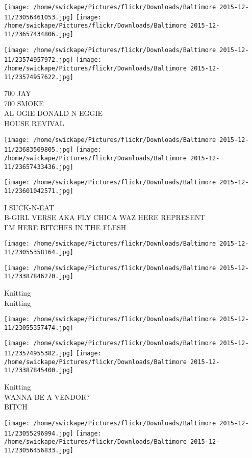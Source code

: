 \documentclass[10pt,letterpaper]{article}
\begin{document}
\texttt{[image: /home/swickape/Pictures/flickr/Downloads/Baltimore 2015-12-11/23056461053.jpg]}
\texttt{[image: /home/swickape/Pictures/flickr/Downloads/Baltimore 2015-12-11/23657434806.jpg]}

\texttt{[image: /home/swickape/Pictures/flickr/Downloads/Baltimore 2015-12-11/23574957972.jpg]}
\texttt{[image: /home/swickape/Pictures/flickr/Downloads/Baltimore 2015-12-11/23574957622.jpg]}

700 JAY\\
700 SMOKE\\
AL OGIE DONALD N EGGIE\\
HOUSE REVIVAL
\pagebreak

\texttt{[image: /home/swickape/Pictures/flickr/Downloads/Baltimore 2015-12-11/23683509805.jpg]}
\texttt{[image: /home/swickape/Pictures/flickr/Downloads/Baltimore 2015-12-11/23657433436.jpg]}

\texttt{[image: /home/swickape/Pictures/flickr/Downloads/Baltimore 2015-12-11/23601042571.jpg]}

I SUCK{-}N{-}EAT\\
B{-}GIRL VERSE AKA FLY CHICA WAZ HERE REPRESENT\\
I'M HERE BITCHES IN THE FLESH
\pagebreak

\texttt{[image: /home/swickape/Pictures/flickr/Downloads/Baltimore 2015-12-11/23055358164.jpg]}

\vspace{0.25in}
\texttt{[image: /home/swickape/Pictures/flickr/Downloads/Baltimore 2015-12-11/23387846270.jpg]}

Knitting\\
Knitting
\pagebreak

\texttt{[image: /home/swickape/Pictures/flickr/Downloads/Baltimore 2015-12-11/23055357474.jpg]}

\vspace{0.25in}
\texttt{[image: /home/swickape/Pictures/flickr/Downloads/Baltimore 2015-12-11/23574955382.jpg]}
\texttt{[image: /home/swickape/Pictures/flickr/Downloads/Baltimore 2015-12-11/23387845400.jpg]}

Knitting\\
WANNA BE A VENDOR?\\
BITCH
\pagebreak

\texttt{[image: /home/swickape/Pictures/flickr/Downloads/Baltimore 2015-12-11/23055296994.jpg]}
\texttt{[image: /home/swickape/Pictures/flickr/Downloads/Baltimore 2015-12-11/23056456833.jpg]}
\end{document}
